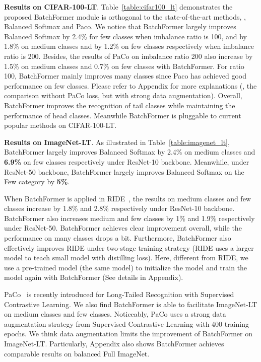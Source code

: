 \documentclass[10pt,twocolumn,letterpaper]{article}
\begin{document}
{\bf Results on CIFAR-100-LT}. Table~\ref{table:cifar100_lt} demonstrates the proposed BatchFormer module is orthogonal to the state-of-the-art methods, \eg, Balanced Softmax and Paco. We notice that BatchFormer largely improves Balanced Softmax by 2.4\% for few classes when imbalance ratio is 100, and by 1.8\% on medium classes and by 1.2\% on few classes respectively when imbalance ratio is 200. Besides, the results of PaCo on imbalance ratio 200 also increase by 1.5\% on medium classes and 0.7\% on few classes with BatchFormer. For ratio 100, BatchFormer mainly improves many classes since Paco has achieved good performance on few classes. Please refer to Appendix for more explanations (\ie, the comparison without PaCo loss, but with strong data augmentation). Overall, BatchFormer improves the recognition of tail classes while maintaining the performance of head classes. Meanwhile BatchFormer is pluggable to current popular methods on CIFAR-100-LT.

{\bf  Results on ImageNet-LT}. As illustrated in Table~\ref{table:imagenet_lt}, BatchFormer largely improves Balanced Softmax by 2.4\% on medium classes and {\bf 6.9\%} on few classes respectively under ResNet-10 backbone. Meanwhile, under ResNet-50 backbone, BatchFormer largely improves Balanced Softmax on the Few category by {\bf 5\%}.

When BatchFormer is applied in RIDE~\cite{wang2020long}, the results on medium classes and few classes increase by 1.8\% and 2.8\% respectively under ResNet-10 backbone. BatchFormer also increases medium and few classes by 1\% and 1.9\% respectively under ResNet-50. BatchFormer achieves clear improvement overall, while the performance on many classes drops a bit. Furthermore, BatchFormer also effectively improves RIDE under two-stage training strategy (RIDE uses a larger model to teach small model with distilling loss). Here, different from RIDE, we use a pre-trained model (the same model) to initialize the model and train the model again with BatchFormer (See details in Appendix).

PaCo~\cite{cui2021parametric} is recently introduced for Long-Tailed Recognition with Supervised Contrastive Learning. We also find BatchFormer is able to facilitate ImageNet-LT on medium classes and few classes. Noticeably, PaCo uses a strong data augmentation strategy from Supervised Contrastive Learning with 400 training epochs. We think data augmentation limits the improvement of BatchFormer on ImageNet-LT. Particularly, Appendix also shows BatchFormer achieves comparable results on balanced Full ImageNet.
\end{document}
